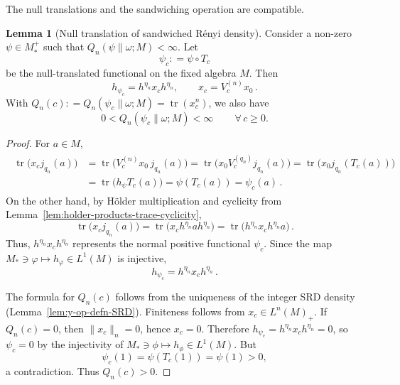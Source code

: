\documentclass[11pt,a4paper]{article}
\theoremstyle{plain}
\numberwithin{theorem}{section}
\theoremstyle{definition}
\newtheorem{lemma}[theorem]{Lemma}
\newcommand{\?}{\overset{?}{=}}
\newcommand{\defeq}{\mathrel{\mathop:}=}
\DeclareMathOperator{\tr}{tr}
\newcommand{\A}{\,\forall\,}
\newcommand{\I}{\infty}
\newcommand{\w}{\omega}
\begin{document}
The null translations and the sandwiching operation are compatible.
\begin{lemma}[Null translation of sandwiched R\'enyi density]
\label{lem:density-propagation-fixed}
Consider a non-zero $\psi\in M_*^+$ such that $Q_n(\psi\|\w;M)<\I$. 
Let
\begin{equation}
    \psi_c \defeq \psi\circ T_c
\end{equation}
be the null-translated functional on the fixed algebra $M$.  Then
\begin{equation}
    h_{\psi_c}=h^{\eta_n}x_ch^{\eta_n},
  \qquad x_c=V_c^{(n)}x_0\,.
\end{equation}
With $Q_n(c)\defeq Q_n(\psi_c\|\omega;M)=\tr(x_c^n)$, we also have
\begin{equation}
    0< Q_n(\psi_c\|\omega;M)<\infty \qquad\A c\geq 0.
\end{equation}
\end{lemma}
\begin{proof}
For $a\in M$,
\begin{align*}
\begin{aligned}
  \tr\bigl(x_cj_{q_n}(a)\bigr)
  &=\tr\bigl(V_c^{(n)}x_0\,j_{q_n}(a)\bigr)=\tr\bigl(x_0V_c^{(q_n)}j_{q_n}(a)\bigr)=\tr\bigl(x_0j_{q_n}(T_c(a))\bigr) \\
  &=\tr\bigl(h_\psi T_c(a)\bigr)=\psi(T_c(a))=\psi_c(a)\,.
  \end{aligned}
\end{align*}
On the other hand, by H\"older multiplication and cyclicity from Lemma~\ref{lem:holder-products-trace-cyclicity},
\begin{equation*}
  \tr\bigl(x_cj_{q_n}(a)\bigr)
  =\tr\bigl(x_ch^{\eta_n}ah^{\eta_n}\bigr)
  =\tr\bigl(h^{\eta_n}x_ch^{\eta_n}a\bigr)\,.
\end{equation*}
Thus, $h^{\eta_n}x_ch^{\eta_n}$ represents the normal positive functional $\psi_c$.  Since the map $M_*\ni\varphi\mapsto h_\varphi\in L^1(M)$ is injective,
\begin{equation*}
  h_{\psi_c}=h^{\eta_n}x_ch^{\eta_n}\,.
\end{equation*}

The formula for $Q_n(c)$ follows from the uniqueness of the integer SRD density (Lemma~\ref{lem:y-op-defn-SRD}).  Finiteness follows from $x_c\in L^n(M)_+$. If \(Q_n(c)=0\), then
\(\|x_c\|_n=0\), hence \(x_c=0\). Therefore \(h_{\psi_c}=h^{\eta_n}x_ch^{\eta_n}=0\),
so \(\psi_c=0\) by the injectivity of \(M_*\ni\phi\mapsto h_\phi\in L^1(M)\).
But
\[
\psi_c(1)=\psi(T_c(1))=\psi(1)>0,
\]
a contradiction. Thus \(Q_n(c)>0\).
\end{proof}
\end{document}
